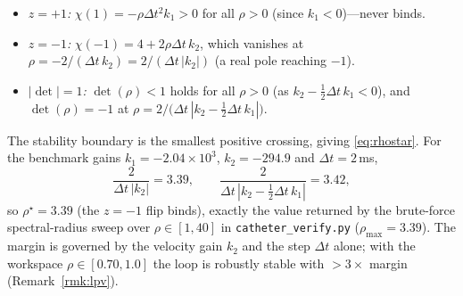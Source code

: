 \begin{itemize}
\item \emph{$z=+1$:} $\chi(1)=-\rho\Delta t^2 k_1>0$ for all $\rho>0$ (since $k_1<0$)---never binds.
\item \emph{$z=-1$:} $\chi(-1)=4+2\rho\Delta t\,k_2$, which vanishes at $\rho=-2/(\Delta t\,k_2)=2/(\Delta t\,|k_2|)$ (a real pole reaching $-1$).
\item \emph{$|\det|=1$:} $\det(\rho)<1$ holds for all $\rho>0$ (as $k_2-\tfrac12\Delta t\,k_1<0$), and $\det(\rho)=-1$ at $\rho=2/\big(\Delta t\,|k_2-\tfrac12\Delta t\,k_1|\big)$.
\end{itemize}
The stability boundary is the smallest positive crossing, giving \eqref{eq:rhostar}. For the benchmark gains $k_1=-2.04\times10^3$, $k_2=-294.9$ and $\Delta t=2$\,ms,
\begin{equation*}
\frac{2}{\Delta t\,|k_2|}=3.39,\qquad \frac{2}{\Delta t\,|k_2-\tfrac12\Delta t\,k_1|}=3.42,
\end{equation*}
so $\rho^\star=3.39$ (the $z=-1$ flip binds), exactly the value returned by the brute-force spectral-radius sweep over $\rho\in[1,40]$ in \texttt{catheter\_verify.py} ($\rho_{\max}=3.39$). The margin is governed by the velocity gain $k_2$ and the step $\Delta t$ alone; with the workspace $\rho\in[0.70,1.0]$ the loop is robustly stable with $>3\times$ margin (Remark~\ref{rmk:lpv}).

